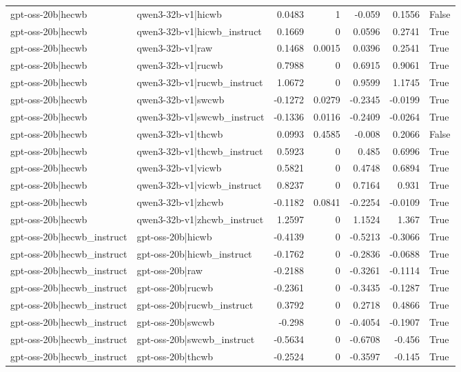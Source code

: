 \begin{table}
\begin{tabular}{l l r r r r l}
gpt-oss-20b|hecwb & qwen3-32b-v1|hicwb & 0.0483 & 1 & -0.059 & 0.1556 & False \\
gpt-oss-20b|hecwb & qwen3-32b-v1|hicwb_instruct & 0.1669 & 0 & 0.0596 & 0.2741 & True \\
gpt-oss-20b|hecwb & qwen3-32b-v1|raw & 0.1468 & 0.0015 & 0.0396 & 0.2541 & True \\
gpt-oss-20b|hecwb & qwen3-32b-v1|rucwb & 0.7988 & 0 & 0.6915 & 0.9061 & True \\
gpt-oss-20b|hecwb & qwen3-32b-v1|rucwb_instruct & 1.0672 & 0 & 0.9599 & 1.1745 & True \\
gpt-oss-20b|hecwb & qwen3-32b-v1|swcwb & -0.1272 & 0.0279 & -0.2345 & -0.0199 & True \\
gpt-oss-20b|hecwb & qwen3-32b-v1|swcwb_instruct & -0.1336 & 0.0116 & -0.2409 & -0.0264 & True \\
gpt-oss-20b|hecwb & qwen3-32b-v1|thcwb & 0.0993 & 0.4585 & -0.008 & 0.2066 & False \\
gpt-oss-20b|hecwb & qwen3-32b-v1|thcwb_instruct & 0.5923 & 0 & 0.485 & 0.6996 & True \\
gpt-oss-20b|hecwb & qwen3-32b-v1|vicwb & 0.5821 & 0 & 0.4748 & 0.6894 & True \\
gpt-oss-20b|hecwb & qwen3-32b-v1|vicwb_instruct & 0.8237 & 0 & 0.7164 & 0.931 & True \\
gpt-oss-20b|hecwb & qwen3-32b-v1|zhcwb & -0.1182 & 0.0841 & -0.2254 & -0.0109 & True \\
gpt-oss-20b|hecwb & qwen3-32b-v1|zhcwb_instruct & 1.2597 & 0 & 1.1524 & 1.367 & True \\
gpt-oss-20b|hecwb_instruct & gpt-oss-20b|hicwb & -0.4139 & 0 & -0.5213 & -0.3066 & True \\
gpt-oss-20b|hecwb_instruct & gpt-oss-20b|hicwb_instruct & -0.1762 & 0 & -0.2836 & -0.0688 & True \\
gpt-oss-20b|hecwb_instruct & gpt-oss-20b|raw & -0.2188 & 0 & -0.3261 & -0.1114 & True \\
gpt-oss-20b|hecwb_instruct & gpt-oss-20b|rucwb & -0.2361 & 0 & -0.3435 & -0.1287 & True \\
gpt-oss-20b|hecwb_instruct & gpt-oss-20b|rucwb_instruct & 0.3792 & 0 & 0.2718 & 0.4866 & True \\
gpt-oss-20b|hecwb_instruct & gpt-oss-20b|swcwb & -0.298 & 0 & -0.4054 & -0.1907 & True \\
gpt-oss-20b|hecwb_instruct & gpt-oss-20b|swcwb_instruct & -0.5634 & 0 & -0.6708 & -0.456 & True \\
gpt-oss-20b|hecwb_instruct & gpt-oss-20b|thcwb & -0.2524 & 0 & -0.3597 & -0.145 & True \\

\end{tabular}
\end{table}
